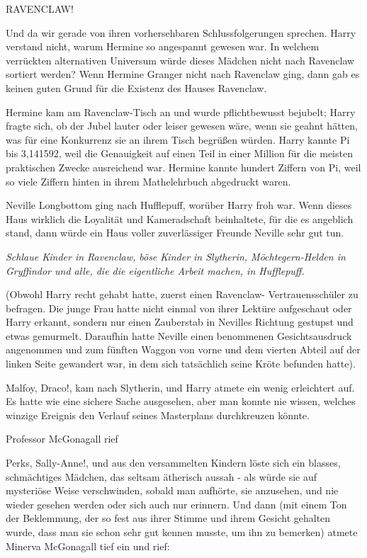 \glqq{}RAVENCLAW!\grqq{}

Und da wir gerade von ihren vorhersehbaren Schlussfolgerungen sprechen. Harry
verstand nicht, warum Hermine so angespannt gewesen war. In welchem verrückten
alternativen Universum würde dieses Mädchen nicht nach Ravenclaw sortiert
werden? Wenn Hermine Granger nicht nach Ravenclaw ging, dann gab es keinen guten
Grund für die Existenz des Hauses Ravenclaw.

Hermine kam am Ravenclaw-Tisch an und wurde pflichtbewusst bejubelt; Harry
fragte sich, ob der Jubel lauter oder leiser gewesen wäre, wenn sie geahnt
hätten, was für eine Konkurrenz sie an ihrem Tisch begrüßen würden. Harry kannte
Pi bis 3,141592, weil die Genauigkeit auf einen Teil in einer Million für die
meisten praktischen Zwecke ausreichend war. Hermine kannte hundert Ziffern von
Pi, weil so viele Ziffern hinten in ihrem Mathelehrbuch abgedruckt waren.

Neville Longbottom ging nach Hufflepuff, worüber Harry froh war. Wenn dieses
Haus wirklich die Loyalität und Kameradschaft beinhaltete, für die es angeblich
stand, dann würde ein Haus voller zuverlässiger Freunde Neville sehr gut tun.

\emph{Schlaue Kinder in Ravenclaw, böse Kinder in Slytherin, Möchtegern-Helden
in Gryffindor und alle, die die eigentliche Arbeit machen, in Hufflepuff.}

(Obwohl Harry recht gehabt hatte, zuerst einen Ravenclaw- Vertrauensschüler zu
befragen. Die junge Frau hatte nicht einmal von ihrer Lektüre aufgeschaut oder
Harry erkannt, sondern nur einen Zauberstab in Nevilles Richtung gestupst und
etwas gemurmelt. Daraufhin hatte Neville einen benommenen Gesichtsausdruck
angenommen und zum fünften Waggon von vorne und dem vierten Abteil auf der
linken Seite gewandert war, in dem sich tatsächlich seine Kröte befunden hatte).

\glqq{}Malfoy, Draco!\grqq{}, kam nach Slytherin, und Harry atmete ein wenig
erleichtert auf. Es hatte wie eine sichere Sache ausgesehen, aber man konnte nie
wissen, welches winzige Ereignis den Verlauf seines Masterplans durchkreuzen
könnte.

Professor McGonagall rief

\glqq{}Perks, Sally-Anne!\grqq{}, und aus den versammelten Kindern löste sich
ein blasses, schmächtiges Mädchen, das seltsam ätherisch aussah - als würde sie
auf mysteriöse Weise verschwinden, sobald man aufhörte, sie anzusehen, und nie
wieder gesehen werden oder sich auch nur erinnern. Und dann (mit einem Ton der
Beklemmung, der so fest aus ihrer Stimme und ihrem Gesicht gehalten wurde, dass
man sie schon sehr gut kennen musste, um ihn zu bemerken) atmete Minerva
McGonagall tief ein und rief:

